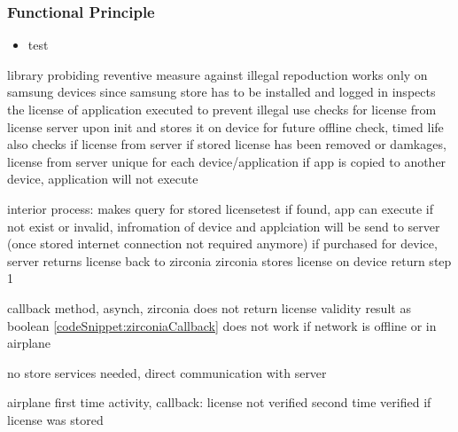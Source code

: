 \subsubsection{Functional Principle} \label{section:license-samsung-functional}
\begin{itemize}
    \item test
\end{itemize}

library probiding reventive measure against illegal repoduction
works only on samsung devices since samsung store has to be installed and logged in
inspects the license of application executed to prevent illegal use
checks for license from license server upon init and stores it on device for future offline check, timed life
also checks if license from server if stored license has been removed or damkages, license from server unique for each device/application
if app is copied to another device, application will not execute

interior process:
makes query for stored licensetest
if found, app can execute
if not exist or invalid, infromation of device and applciation will be send to server (once stored internet connection not required anymore)
if purchased for device, server returns license back to zirconia
zirconia stores license on device
return step 1

callback method, asynch, zirconia does not return license validity result as boolean \ref{codeSnippet:zirconiaCallback}
does not work if network is offline or in airplane

\cite{samsungZirconia}
%



no store services needed, direct communication with server

airplane
first time
activity, callback: license not verified
second time
verified if license was stored
